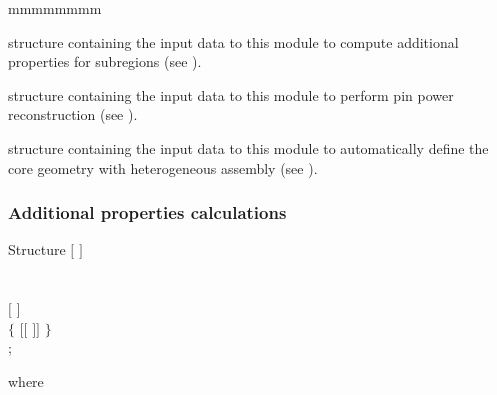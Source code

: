 \begin{ListeDeDescription}{mmmmmmmm}
\item[\dstr{descnap1}] structure containing the input data to this module to compute additional properties for subregions
(see ).

\item[\dstr{descnap2}] structure containing the input data to this module to perform pin power reconstruction
(see ).

\item[\dstr{descnap3}] structure containing the input data to this module to automatically define the core geometry with heterogeneous assembly
(see ).

\end{ListeDeDescription}

\subsubsection{Additional properties calculations}\label{sect:descnap1}

\begin{DataStructure}{Structure }
$[$   $]$ \\
\\
   \\
$[$   $]$ \\
$\{$ $[[$    $]]$ $\}$ \\
;
\end{DataStructure}

\noindent where

